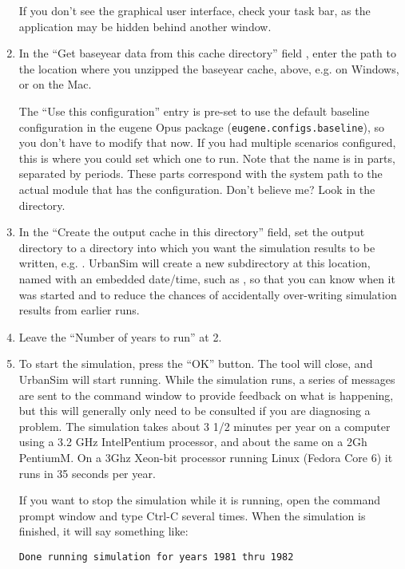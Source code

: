 \documentclass{howto}
\begin{document}
\begin{enumerate}
If you don't see the graphical user interface, check your task bar, as the
application may be hidden behind another window.

\item In the ``Get baseyear data from this cache directory'' field , enter the
path to the location where you unzipped the
baseyear cache, above, e.g. 
on Windows, or
 on the Mac.

The ``Use this configuration'' entry is pre-set to use the
default baseline configuration in the eugene Opus package
(\verb|eugene.configs.baseline|), so you don't have to modify that
now.  If you had multiple scenarios configured, this is where you
could set which one to run.  Note that the name is in parts,
separated by periods.  These parts correspond with the system path
to the actual module that has the configuration.  Don't believe me?
Look in the  directory.

\item In the ``Create the output cache in this directory'' field, set the
output directory to a directory into which you want the simulation results to be
written, e.g. . UrbanSim will
create a new subdirectory at this location, named with an embedded date/time, such as
, so that you can know when it was
started and to reduce the chances of accidentally over-writing
simulation results from earlier runs.

\item Leave the ``Number of years to run'' at 2.

\item To start the simulation, press the ``OK'' button.  The tool will
close, and UrbanSim will start running. While the simulation runs, a
series of messages are sent to the command window to provide
feedback on what is happening, but this will generally only need to
be consulted if you are diagnosing a problem. The simulation takes
about 3 1/2 minutes per year on a computer using a 3.2 GHz
Intel\textregistered Pentium processor, and about
the same on a 2Gh Pentium\textregistered M.  On a 3Ghz
Xeon-bit processor running Linux (Fedora Core 6)
it runs in 35 seconds per year.

If you want to stop the simulation while it is running, open the
command prompt window and type Ctrl-C several times. When the
simulation is finished, it will say something like:

\begin{verbatim}
Done running simulation for years 1981 thru 1982
\end{verbatim}

\end{enumerate}
\end{document}
